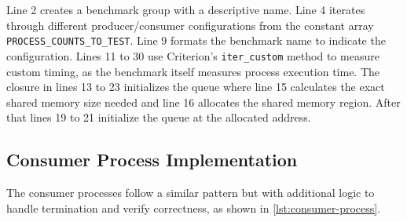 Line 2 creates a benchmark group with a descriptive name. Line 4 iterates through different producer/consumer configurations from the constant array \texttt{PROCESS\_COUNTS\_TO\_TEST}. Line 9 formats the benchmark name to indicate the configuration. Lines 11 to 30 use Criterion's \texttt{iter\_custom} method to measure custom timing, as the benchmark itself measures process execution time. The closure in lines 13 to 23 initializes the queue where line 15 calculates the exact shared memory size needed and line 16 allocates the shared memory region. After that lines 19 to 21 initialize the queue at the allocated address.

\subsection{Consumer Process Implementation}
The consumer processes follow a similar pattern but with additional logic to handle termination and verify correctness, as shown in \cref{lst:consumer-process}.

